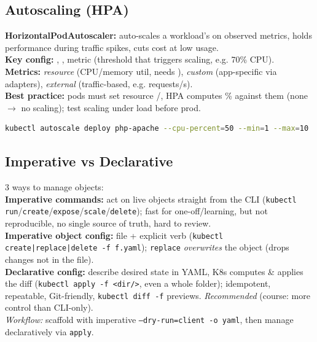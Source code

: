 \subsection{Autoscaling (HPA)}
\textbf{HorizontalPodAutoscaler:} auto-scales a workload's  on observed metrics, holds performance during traffic spikes, cuts cost at low usage. \\
\textbf{Key config:} , ,  metric (threshold that triggers scaling, e.g. 70\% CPU). \\
\textbf{Metrics:} \textit{resource} (CPU/memory util, needs ), \textit{custom} (app-specific via adapters), \textit{external} (traffic-based, e.g. requests/s). \\
\textbf{Best practice:} pods must set resource /, HPA computes \% against them (none $\to$ no scaling); test scaling under load before prod.
\begin{lstlisting}[language=sh]
kubectl autoscale deploy php-apache --cpu-percent=50 --min=1 --max=10
\end{lstlisting}

\subsection{Imperative vs Declarative}
3 ways to manage objects: \\
\textbf{Imperative commands:} act on live objects straight from the CLI (\texttt{kubectl run}/\texttt{create}/\texttt{expose}/\texttt{scale}/\texttt{delete}); fast for one-off/learning, but not reproducible, no single source of truth, hard to review. \\
\textbf{Imperative object config:} file + explicit verb (\texttt{kubectl create|replace|delete -f f.yaml}); \texttt{replace} \textit{overwrites} the object (drops changes not in the file). \\
\textbf{Declarative config:} describe desired state in YAML, K8s computes \& applies the diff (\texttt{kubectl apply -f <dir/>}, even a whole folder); idempotent, repeatable, Git-friendly, \texttt{kubectl diff -f} previews. \textit{Recommended} (course: more control than CLI-only). \\
\textit{Workflow:} scaffold with imperative \texttt{--dry-run=client -o yaml}, then manage declaratively via \texttt{apply}.

